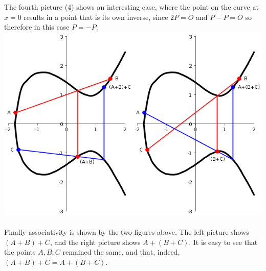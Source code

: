 The fourth picture ($4$) shows an interesting case, where the point on the curve at $x=0$ results in a point that is its own inverse, since $2P=O$ and $P-P=O$ so therefore in this case $P=-P$.
\\
\includegraphics[width=0.5\textwidth]{EllAss1}\includegraphics[width=0.5\textwidth]{EllAss2}
\\
\\
Finally associativity is shown by the two figures above. The left picture shows $(A+B)+C$, and the right picture shows $A+(B+C)$. It is easy to see that the points $A,B,C$ remained the same, and that, indeed, $(A+B)+C=A+(B+C)$.
